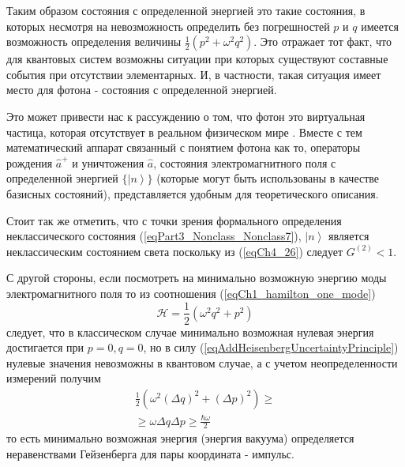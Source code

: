 \begin{remark}
  Таким образом состояния с определенной энергией это такие состояния,
  в которых несмотря на невозможность определить без погрешностей $p$
  и $q$ имеется возможность определения величины 
  \(
  \frac{1}{2} \left(p^2 +
  \omega^2q^2\right)
  \). Это отражает тот факт, что для квантовых систем возможны
  ситуации при которых существуют составные события при отсутствии
  элементарных. И, в частности, такая ситуация имеет место для фотона
  - состояния с определенной энергией.

  Это может привести нас к рассуждению о том, что фотон это
  виртуальная частица, которая отсутствует в реальном физическом мире
  \cite{Lamb1995}. Вместе с тем математический аппарат связанный с
  понятием фотона как то, операторы рождения $\hat{a}^{+}$ и
  уничтожения $\hat{a}$, состояния электромагнитного поля с
  определенной энергией $\{\left|n\right>\}$ (которые могут быть
  использованы в качестве базисных состояний), представляется удобным
  для теоретического описания.

  Стоит так же отметить, что с точки зрения формального определения
  неклассического состояния (\ref{eqPart3_Nonclass_Nonclass7}),
  $\left|n\right>$ является неклассическим 
  состоянием света поскольку из (\ref{eqCh4_26}) следует $G^{(2)} <
  1$.

  С другой стороны, если посмотреть на минимально возможную энергию
  моды электромагнитного поля то из соотношения
  (\ref{eqCh1_hamilton_one_mode}) 
  \[
  \mathcal{H} = \frac{1}{2}\left(\omega^2 q^2 + p^2\right)
  \]
  следует, что в классическом случае минимально возможная нулевая
  энергия достигается при $p = 0, q=0$, но в силу
  (\ref{eqAddHeisenbergUncertaintyPrinciple}) нулевые значения
  невозможны в квантовом случае, а с учетом неопределенности измерений
  получим 
  \begin{eqnarray}
    \frac{1}{2}\left(\omega^2 (\Delta q)^2 + (\Delta p)^2\right) \ge
    \nonumber \\
    \ge \omega \Delta q \Delta p \ge \frac{\hbar \omega}{2}
    \nonumber
  \end{eqnarray}
  то есть минимально возможная энергия (энергия вакуума) определяется
  неравенствами Гейзенберга для пары координата - импульс.  
  \label{rem:antiphoton}
\end{remark}
